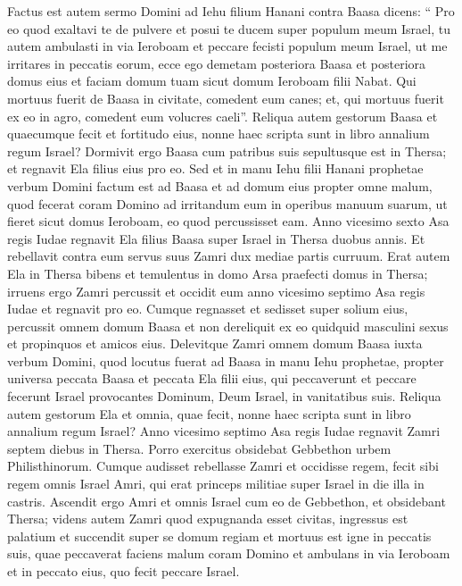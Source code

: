 \begin{biblechapter}
\begin{biblechapter}
\begin{biblechapter}
\begin{biblechapter}
\begin{biblechapter}
\begin{biblechapter}
\begin{biblechapter}
\begin{biblechapter}
\begin{biblechapter}
\begin{biblechapter}
\begin{biblechapter}
\begin{biblechapter}
\begin{biblechapter}
\begin{biblechapter}
\begin{biblechapter}
\begin{biblechapter}
\verse Factus est autem sermo Domini ad Iehu filium Hanani contra Baasa dicens: 
\verse “ Pro eo quod exaltavi te de pulvere et posui te ducem super populum meum Israel, tu autem ambulasti in via Ieroboam et peccare fecisti populum meum Israel, ut me irritares in peccatis eorum, 
\verse ecce ego demetam posteriora Baasa et posteriora domus eius et faciam domum tuam sicut domum Ieroboam filii Nabat. 
\verse Qui mortuus fuerit de Baasa in civitate, comedent eum canes; et, qui mortuus fuerit ex eo in agro, comedent eum volucres caeli”.
 \verse Reliqua autem gestorum Baasa et quaecumque fecit et fortitudo eius, nonne haec scripta sunt in libro annalium regum Israel? 
\verse Dormivit ergo Baasa cum patribus suis sepultusque est in Thersa; et regnavit Ela filius eius pro eo.
 \verse Sed et in manu Iehu filii Hanani prophetae verbum Domini factum est ad Baasa et ad domum eius propter omne malum, quod fecerat coram Domino ad irritandum eum in operibus manuum suarum, ut fieret sicut domus Ieroboam, eo quod percussisset eam.
 \verse Anno vicesimo sexto Asa regis Iudae regnavit Ela filius Baasa super Israel in Thersa duobus annis. 
\verse Et rebellavit contra eum servus suus Zamri dux mediae partis curruum. Erat autem Ela in Thersa bibens et temulentus in domo Arsa praefecti domus in Thersa; 
\verse irruens ergo Zamri percussit et occidit eum anno vicesimo septimo Asa regis Iudae et regnavit pro eo. 
\verse Cumque regnasset et sedisset super solium eius, percussit omnem domum Baasa et non dereliquit ex eo quidquid masculini sexus et propinquos et amicos eius. 
\verse Delevitque Zamri omnem domum Baasa iuxta verbum Domini, quod locutus fuerat ad Baasa in manu Iehu prophetae, 
\verse propter universa peccata Baasa et peccata Ela filii eius, qui peccaverunt et peccare fecerunt Israel provocantes Dominum, Deum Israel, in vanitatibus suis.
 \verse Reliqua autem gestorum Ela et omnia, quae fecit, nonne haec scripta sunt in libro annalium regum Israel?
 \verse Anno vicesimo septimo Asa regis Iudae regnavit Zamri septem diebus in Thersa. Porro exercitus obsidebat Gebbethon urbem Philisthinorum. 
\verse Cumque audisset rebellasse Zamri et occidisse regem, fecit sibi regem omnis Israel Amri, qui erat princeps militiae super Israel in die illa in castris. 
\verse Ascendit ergo Amri et omnis Israel cum eo de Gebbethon, et obsidebant Thersa; 
\verse videns autem Zamri quod expugnanda esset civitas, ingressus est palatium et succendit super se domum regiam et mortuus est igne 
\verse in peccatis suis, quae peccaverat faciens malum coram Domino et ambulans in via Ieroboam et in peccato eius, quo fecit peccare Israel.

\end{biblechapter}
\end{biblechapter}
\end{biblechapter}
\end{biblechapter}
\end{biblechapter}
\end{biblechapter}
\end{biblechapter}
\end{biblechapter}
\end{biblechapter}
\end{biblechapter}
\end{biblechapter}
\end{biblechapter}
\end{biblechapter}
\end{biblechapter}
\end{biblechapter}
\end{biblechapter}
